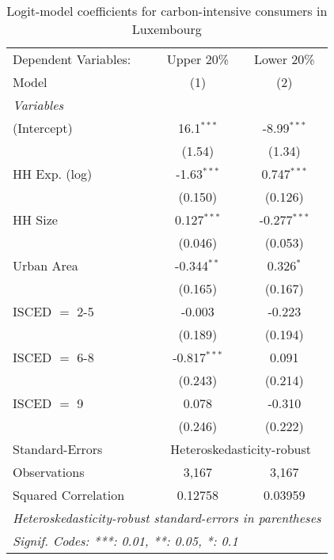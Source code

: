 
\begin{table}[htbp!]
   \centering
   \small
   \begin{adjustbox}{width = 1\textwidth, max height = 0.95\textheight, center}
      \begin{threeparttable}[b]
         \caption{\label{tab:Logit_1_LUX} Logit-model coefficients for carbon-intensive consumers in Luxembourg}
         \begin{tabular}{lcc}
            \tabularnewline \midrule \midrule
            Dependent Variables: & Upper 20\%     & Lower 20\%\\   
            Model                & (1)            & (2)\\  
            \midrule
            \emph{Variables}\\
            (Intercept)          & 16.1$^{***}$   & -8.99$^{***}$\\   
                                 & (1.54)         & (1.34)\\   
            HH Exp. (log)        & -1.63$^{***}$  & 0.747$^{***}$\\   
                                 & (0.150)        & (0.126)\\   
            HH Size              & 0.127$^{***}$  & -0.277$^{***}$\\   
                                 & (0.046)        & (0.053)\\   
            Urban Area           & -0.344$^{**}$  & 0.326$^{*}$\\   
                                 & (0.165)        & (0.167)\\   
            ISCED $=$ 2-5        & -0.003         & -0.223\\   
                                 & (0.189)        & (0.194)\\   
            ISCED $=$ 6-8        & -0.817$^{***}$ & 0.091\\   
                                 & (0.243)        & (0.214)\\   
            ISCED $=$ 9          & 0.078          & -0.310\\   
                                 & (0.246)        & (0.222)\\   
            \midrule 
            Standard-Errors & \multicolumn{2}{c}{Heteroskedasticity-robust} \\ 
            Observations         & 3,167          & 3,167\\  
            Squared Correlation  & 0.12758        & 0.03959\\  
            \midrule \midrule
            \multicolumn{3}{l}{\emph{Heteroskedasticity-robust standard-errors in parentheses}}\\
            \multicolumn{3}{l}{\emph{Signif. Codes: ***: 0.01, **: 0.05, *: 0.1}}\\
         \end{tabular}
         

\end{threeparttable}
\end{adjustbox}
\end{table}
